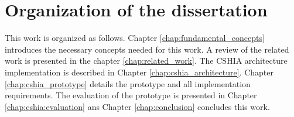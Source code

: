 \section{Organization of the dissertation}
\label{sec:organization_of_dissertation}
This work is organized as follows. Chapter \ref{chap:fundamental_concepts} introduces the necessary concepts  needed for this work. A review of the related work is presented in the chapter \ref{chap:related_work}.  The CSHIA architecture implementation is described in Chapter \ref{chap:cshia_architecture}. Chapter \ref{chap:cshia_prototype} details the prototype and all implementation requirements. The evaluation of the prototype is presented in Chapter \ref{chap:cshia:evaluation} ans Chapter \ref{chap:conclusion} concludes this work.


